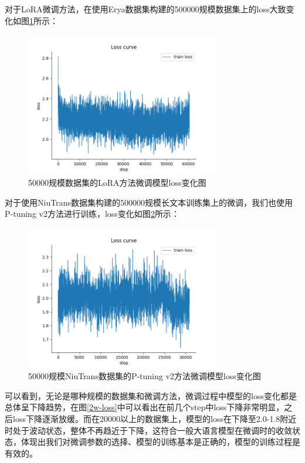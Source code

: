 \documentclass[
    decl-page,  %
    ,fontset = win, %
  ]{njuthesis}
\begin{document}
对于LoRA微调方法，在使用Erya数据集构建的500000规模数据集上的loss大致变化如图\ref{50w-lora-loss}所示：

\begin{figure}[h]
  \centering
  \includegraphics[width=0.75\textwidth]{image/50w-lora-loss.png}
  \caption{50000规模数据集的LoRA方法微调模型loss变化图}
  \label{50w-lora-loss}
\end{figure}

对于使用NiuTrans数据集构建的500000规模长文本训练集上的微调，我们也使用P-tuning v2方法进行训练，loss变化如图\ref{50w-long-loss}所示：

\begin{figure}[h]
  \centering
  \includegraphics[width=0.75\textwidth]{image/50w-long-loss.png}
  \caption{50000规模NiuTrans数据集的P-tuning v2方法微调模型loss变化图}
  \label{50w-long-loss}
\end{figure}

可以看到，无论是哪种规模的数据集和微调方法，微调过程中模型的loss变化都是总体呈下降趋势，在图\ref{2w-loss}中可以看出在前几个step中loss下降非常明显，之后loss下降逐渐放缓。而在20000以上的数据集上，模型的loss在下降至2.0-1.8附近时处于波动状态，整体不再趋近于下降，这符合一般大语言模型在微调时的收敛状态，体现出我们对微调参数的选择、模型的训练基本是正确的，模型的训练过程是有效的。
\end{document}
